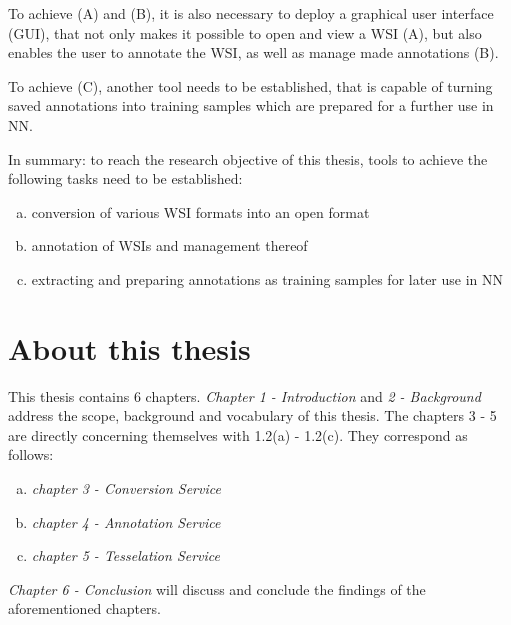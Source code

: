 To achieve (A) and (B), it is also necessary to deploy a graphical user interface (GUI), that not only makes it possible to open and view a WSI (A), but also enables the user to annotate the WSI, as well as manage made annotations (B).

To achieve (C), another tool needs to be established, that is capable of turning saved annotations into training samples which are prepared for a further use in NN.

In summary: to reach the research objective of this thesis, tools to achieve the following tasks need to be established:
\begin{enumerate}[(a)]
	\item conversion of various WSI formats into an open format
	\item annotation of WSIs and management thereof
	\item extracting and preparing annotations as training samples for later use in NN
\end{enumerate}

\section{About this thesis}
This thesis contains 6 chapters. \emph{Chapter 1 - Introduction} and \emph{2 - Background} address the scope, background and vocabulary of this thesis. The chapters 3 - 5 are directly concerning themselves with 1.2(a) - 1.2(c). They correspond as follows:
\begin{enumerate}[(a):]
	\item \emph{chapter 3 - Conversion Service}
	\item \emph{chapter 4 - Annotation Service}
	\item \emph{chapter 5 - Tesselation Service}
\end{enumerate}
\emph{Chapter 6 - Conclusion} will discuss and conclude the findings of the aforementioned chapters.